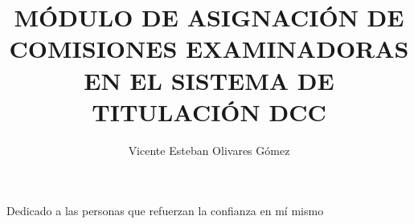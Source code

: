 \documentclass{umemoria}
\author{Vicente Esteban Olivares Gómez}
\title{MÓDULO DE ASIGNACIÓN DE COMISIONES EXAMINADORAS EN EL SISTEMA DE TITULACIÓN DCC}
\begin{document}
\frontmatter
\maketitle





\begin{dedicatoria}
    Dedicado a las personas que refuerzan la confianza en mí mismo
\end{dedicatoria}

\begin{thanks}
    
\end{thanks}

\tableofcontents
\listoffigures %
\lstlistoflistings %

\mainmatter









\nocite{*}



\begin{appendices}
    
\end{appendices}
\end{document}
